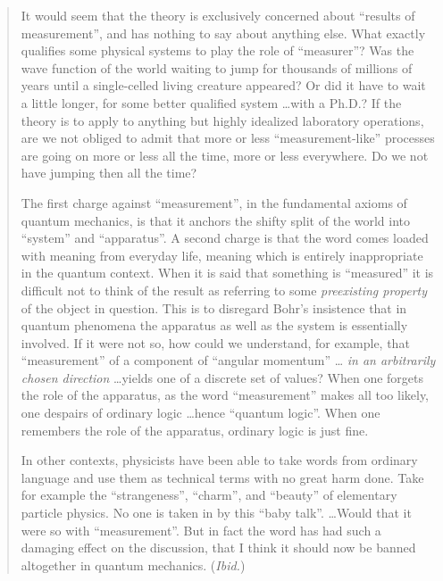 \documentclass[12pt]{article}
\begin{document}
\begin{quotation}\small\noindent
   It would seem that the theory is exclusively concerned about
   ``results of measurement'', and has nothing to say about anything
   else.  What exactly qualifies some physical systems to play the role
   of ``measurer''?  Was the wave function of the world waiting to jump
   for thousands of millions of years until a single-celled living
   creature appeared?  Or did it have to wait a little longer, for some
   better qualified system \dots with a Ph.D.?  If the theory is to
   apply to anything but highly idealized laboratory operations, are we
   not obliged to admit that more or less ``measurement-like''
   processes are going on more or less all the time, more or less
   everywhere.  Do we not have jumping then all the time?

   The first charge against ``measurement'', in the fundamental axioms
   of quantum mechanics, is that it anchors the shifty split of the
   world into ``system'' and ``apparatus''.  A second charge is that
   the word comes loaded with meaning {}from everyday life, meaning
   which is entirely inappropriate in the quantum context.  When it is
   said that something is ``measured'' it is difficult not to think of
   the result as referring to some {\it preexisting property\/} of the
   object in question.  This is to disregard Bohr's insistence that in
   quantum phenomena the apparatus as well as the system is essentially
   involved.  If it were not so, how could we understand, for example,
   that ``measurement'' of a component of ``angular momentum'' \dots
   {\it in an arbitrarily chosen direction\/} \dots yields one of a
   discrete set of values?  When one forgets the role of the apparatus,
   as the word ``measurement'' makes all too likely, one despairs of
   ordinary logic \dots hence ``quantum logic''.  When one remembers
   the role of the apparatus, ordinary logic is just fine.

   In other contexts, physicists have been able to take words {}from
   ordinary language and use them as technical terms with no great harm
   done.  Take for example the ``strangeness'', ``charm'', and
   ``beauty'' of elementary particle physics.  No one is taken in by
   this ``baby talk''. \dots Would that it were so with
   ``measurement''.  But in fact the word has had such a damaging
   effect on the discussion, that I think it should now be banned
   altogether in quantum mechanics.  ({\sl Ibid.\/})
\end{quotation}
\end{document}
